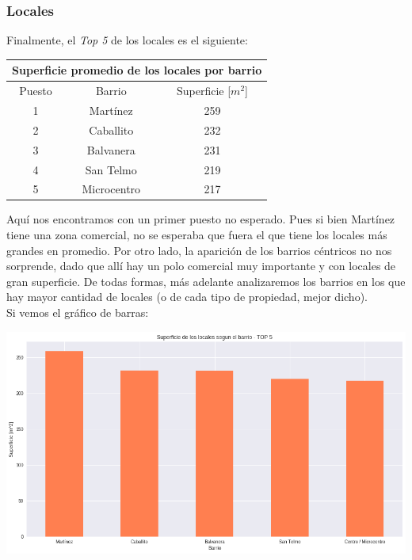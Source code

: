 \documentclass[a4paper, 10pt]{article}
\newcommand\tab[1][0.5cm]{\hspace*{#1}}
\begin{document}
				\subsubsection{Locales}
					Finalmente, el \emph{Top 5} de los locales es el siguiente:
					\begin{center}
						\begin{tabular}{ |c|c|c| }
							\hline
							\multicolumn{3}{|c|}{Superficie promedio de los locales por barrio}\\
							\hline
							\hline
							Puesto & Barrio & Superficie [$m^2$]\\
							\hline
							1 & Martínez & 259\\
							2 & Caballito & 232\\
							3 & Balvanera & 231\\
							4 & San Telmo & 219\\
							5 & Microcentro & 217\\
							\hline
						\end{tabular}
					\end{center}
					\tab Aquí nos encontramos con un primer puesto no esperado. Pues si bien Martínez tiene una zona comercial, no
					se esperaba que fuera el que tiene los locales más grandes en promedio. Por otro lado, la aparición de los
					barrios céntricos no nos sorprende, dado que allí hay un polo comercial muy importante y con locales de gran
					superficie. De todas formas, más adelante analizaremos los barrios en los que hay mayor cantidad de locales (o
					de cada tipo de propiedad, mejor dicho). \\
					\tab Si vemos el gráfico de barras:
					\begin{center}
   		    				\includegraphics[width=\textwidth]{images/storeSurfaceTopBar}
				  	\end{center}
\end{document}
